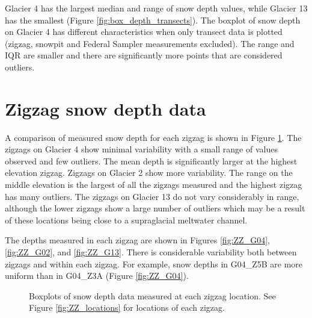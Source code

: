 \documentclass{sfuthesis}
\begin{document}
Glacier 4 has the largest median and range of snow depth values, while Glacier 13 has the smallest (Figure \ref{fig:box_depth_transects}). The boxplot of snow depth on Glacier 4 has different characteristics when only transect data is plotted (zigzag, snowpit and Federal Sampler measurements excluded). The range and IQR are smaller and there are significantly more points that are considered outliers. 

\pagebreak
\section{Zigzag snow depth data}

A comparison of measured snow depth for each zigzag is shown in Figure \ref{fig:ZZ_boxplot}. The zigzags on Glacier 4 show minimal variability with a small range of values observed and few outliers. The mean depth is significantly larger at the highest elevation zigzag. Zigzags on Glacier 2 show more variability. The range on the middle elevation is the largest of all the zigzags measured and the highest zigzag has many outliers. The zigzags on Glacier 13 do not vary considerably in range, although the lower zigzags show a large number of outliers which may be a result of these locations being close to a supraglacial meltwater channel. 

The depths measured in each zigzag are shown in Figures \ref{fig:ZZ_G04}, \ref{fig:ZZ_G02}, and \ref{fig:ZZ_G13}. There is considerable variability both between zigzags and within each zigzag. For example, snow depths in G04\_Z5B are more uniform than in G04\_Z3A (Figure \ref{fig:ZZ_G04}). 

\begin{figure}[H]
	\centering
	\caption{Boxplots of snow depth data measured at each zigzag location. See Figure \ref{fig:ZZ_locations} for locations of each zigzag.}
	\label{fig:ZZ_boxplot}
\end{figure}
\end{document}
